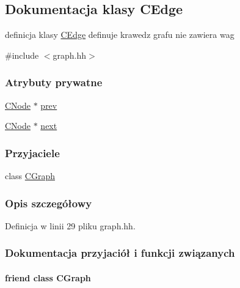 \hypertarget{class_c_edge}{}\subsection{Dokumentacja klasy C\+Edge}
\label{class_c_edge}


definicja klasy \hyperlink{class_c_edge}{C\+Edge} definuje krawedz grafu nie zawiera wag  




{\ttfamily \#include $<$graph.\+hh$>$}

\subsubsection*{Atrybuty prywatne}
\begin{DoxyCompactItemize}
\item 
\hyperlink{class_c_node}{C\+Node} $\ast$ \hyperlink{class_c_edge_a6028b71c45755a0f37cd6e240b357bac}{prev}
\item 
\hyperlink{class_c_node}{C\+Node} $\ast$ \hyperlink{class_c_edge_ad1ee614fba28429ff44c5c793676cbd4}{next}
\end{DoxyCompactItemize}
\subsubsection*{Przyjaciele}
\begin{DoxyCompactItemize}
\item 
class \hyperlink{class_c_edge_a5ba04087b017dfeadb708ba91d6daf1b}{C\+Graph}
\end{DoxyCompactItemize}


\subsubsection{Opis szczegółowy}


Definicja w linii 29 pliku graph.\+hh.



\subsubsection{Dokumentacja przyjaciół i funkcji związanych}
\hypertarget{class_c_edge_a5ba04087b017dfeadb708ba91d6daf1b}{}
\paragraph[{C\+Graph}]{\setlength{\rightskip}{0pt plus 5cm}friend class {\bf C\+Graph}\hspace{0.3cm}{\ttfamily [friend]}}\label{class_c_edge_a5ba04087b017dfeadb708ba91d6daf1b}


